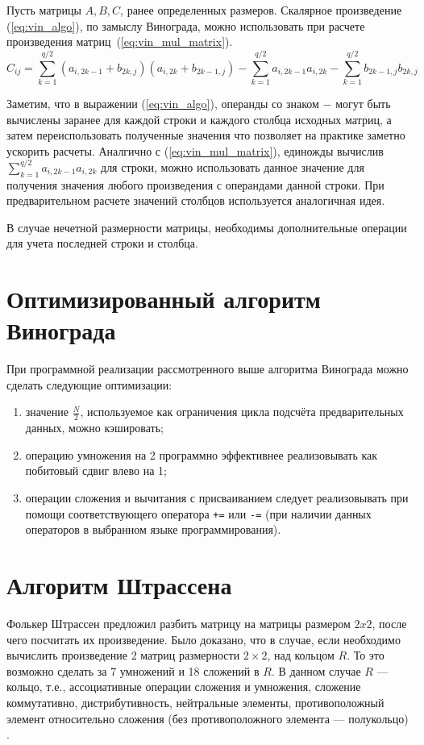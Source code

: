 Пусть матрицы $A, B, C$, ранее определенных размеров. Скалярное произведение (\ref{eq:vin_algo}), по замыслу Винограда, можно использовать при расчете 
произведения матриц~(\ref{eq:vin_mul_matrix}).
\begin{equation} 
	\label{eq:vin_mul_matrix}
	C_{ij} = \sum_{k=1}^{q/2}(a_{i,2k-1} + b_{2k,j})(a_{i,2k} + b_{2k-1,j}) - \sum_{k=1}^{q/2} a_{i,2k-1}a_{i,2k} - \sum_{k=1}^{q/2} b_{2k-1,j}b_{2k,j}
\end{equation}


Заметим, что в выражении (\ref{eq:vin_algo}), операнды со знаком $-$ могут быть вычислены заранее для каждой
строки и каждого столбца исходных матриц, а затем переиспользовать полученные значения что позволяет на практике заметно ускорить расчеты.
Аналгично с (\ref{eq:vin_mul_matrix}), единожды вычислив $\sum_{k=1}^{q/2}a_{i,2k-1}a_{i,2k}$ для строки, можно использовать данное
значение для получения значения любого произведения с операндами данной строки. При  предварительном расчете 
значений столбцов используется аналогичная идея.

В случае нечетной размерности матрицы, необходимы дополнительные операции для учета последней строки и столбца.



\section{Оптимизированный алгоритм Винограда}

При программной реализации рассмотренного выше алгоритма Винограда можно сделать следующие оптимизации:
\begin{enumerate}
	\item значение $\frac{N}{2}$, используемое как ограничения цикла подсчёта предварительных данных, можно кэшировать;
	\item операцию умножения на 2 программно эффективнее реализовывать как побитовый сдвиг влево на 1;
	\item операции сложения и вычитания с присваиванием следует реализовывать при помощи соответствующего оператора \texttt{+=} или \texttt{-=} (при наличии данных операторов в выбранном языке программирования).
\end{enumerate}

\section{Алгоритм Штрассена}
Фолькер Штрассен предложил разбить матрицу на матрицы размером $2x2$, после чего посчитать их произведение. Было доказано, что в случае, если необходимо вычислить
произведение 2 матриц размерности $2\times2$, над кольцом $R$. То это возможно сделать за 7 умножений и 18 сложений в $R$. В данном случае $R$ — кольцо, т.е., ассоциативные операции сложения и умножения, сложение коммутативно, дистрибутивность, нейтральные элементы, противоположный элемент относительно
сложения (без противоположного элемента — полукольцо) \cite{stras}.

